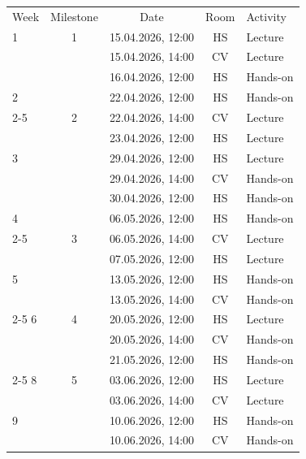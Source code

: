 \documentclass[a4paper]{article}
\newcommand{\lec}{\cellcolor{lecturecolor}Lecture}
\newcommand{\hon}{\cellcolor{handsoncolor}Hands-on}
\newlength{\ruleextra}
\newcommand{\widetoprule}{\noalign{\vskip-\abovetopsep\vskip\aboverulesep\moveleft\ruleextra\vbox{\hrule width\dimexpr\linewidth+2\ruleextra\relax height\heavyrulewidth}\vskip\belowrulesep}}
\newcommand{\widemidrule}{\noalign{\vskip\aboverulesep\moveleft\ruleextra\vbox{\hrule width\dimexpr\linewidth+2\ruleextra\relax height\lightrulewidth}\vskip\belowrulesep}}
\begin{document}
\renewcommand{\arraystretch}{1.2}
\begin{table}[ht]
\centering
\begin{tabular*}{\textwidth}{@{} l @{\hspace{0.8em}} c @{\extracolsep{\fill}} c @{\hspace{1em}} c l @{}}
\widetoprule
Week & Milestone & Date & Room & Activity \\
\widemidrule
\cellcolor{weekA} 1  & 1 & 15.04.2026, 12:00 & HS & \lec \\
\cellcolor{weekA}    &   & 15.04.2026, 14:00 & CV & \lec \\
\cellcolor{weekA}    &   & 16.04.2026, 12:00 & HS & \hon \\
\cellcolor{weekB} 2  &   & 22.04.2026, 12:00 & HS & \hon \\
\cmidrule(l){2-5}
\cellcolor{weekB}    & 2 & 22.04.2026, 14:00 & CV & \lec \\
\cellcolor{weekB}    &   & 23.04.2026, 12:00 & HS & \lec \\
\cellcolor{weekA} 3  &   & 29.04.2026, 12:00 & HS & \lec \\
\cellcolor{weekA}    &   & 29.04.2026, 14:00 & CV & \hon \\
\cellcolor{weekA}    &   & 30.04.2026, 12:00 & HS & \hon \\
\cellcolor{weekB} 4  &   & 06.05.2026, 12:00 & HS & \hon \\
\cmidrule(l){2-5}
\cellcolor{weekB}    & 3 & 06.05.2026, 14:00 & CV & \lec \\
\cellcolor{weekB}    &   & 07.05.2026, 12:00 & HS & \lec \\
\cellcolor{weekA} 5  &   & 13.05.2026, 12:00 & HS & \hon \\
\cellcolor{weekA}    &   & 13.05.2026, 14:00 & CV & \hon \\
\cmidrule(l){2-5}
\cellcolor{weekB} 6  & 4 & 20.05.2026, 12:00 & HS & \lec \\
\cellcolor{weekB}    &   & 20.05.2026, 14:00 & CV & \hon \\
\cellcolor{weekB}    &   & 21.05.2026, 12:00 & HS & \hon \\
\cmidrule(l){2-5}
\cellcolor{weekA} 8  & 5 & 03.06.2026, 12:00 & HS & \lec \\
\cellcolor{weekA}    &   & 03.06.2026, 14:00 & CV & \lec \\
\cellcolor{weekB} 9  &   & 10.06.2026, 12:00 & HS & \hon \\
\cellcolor{weekB}    &   & 10.06.2026, 14:00 & CV & \hon \\

\end{tabular*}
\end{table}
\end{document}
